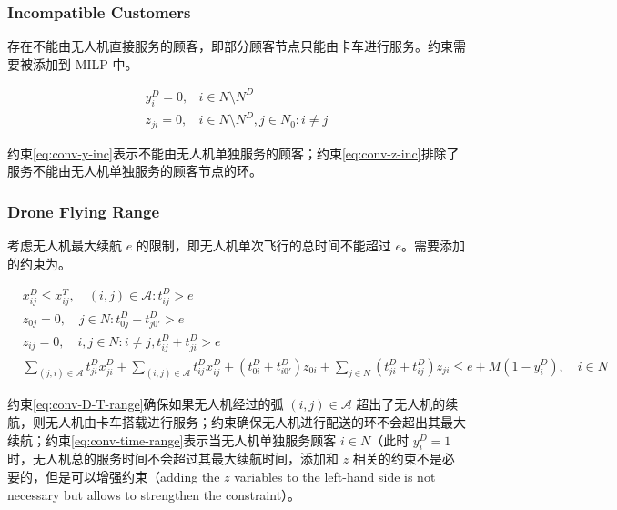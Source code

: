 \documentclass[fontset=none]{ctexart}
\begin{document}
\subsubsection{Incompatible Customers}
存在不能由无人机直接服务的顾客，即部分顾客节点只能由卡车进行服务。约束需要被添加到 MILP 中。

\begin{corollary}
    \begin{align}
        y_i^D = 0, & i \in N \setminus N^D \tag{4a} \label{eq:conv-y-inc} \\
        z_{ji} = 0, & i \in N \setminus N^D, j \in N_0: i \neq j \tag{4b} \label{eq:conv-z-inc}
    \end{align}
\end{corollary}

约束\cref{eq:conv-y-inc}表示不能由无人机单独服务的顾客；约束\cref{eq:conv-z-inc}排除了服务不能由无人机单独服务的顾客节点的环。

\subsubsection{Drone Flying Range}\label{sec:drone-flying-range}
考虑无人机最大续航 $e$ 的限制，即无人机单次飞行的总时间不能超过 $e$。需要添加的约束为。

\begin{corollary}
    \begin{align}
        & x_{ij}^D \leq x_{ij}^T, \quad (i, j) \in \mathcal{A}: t_{ij}^D > e \tag{5a}\label{eq:conv-D-T-range} \\
        & z_{0j} = 0, \quad j \in N: t_{0j}^D + t_{j0'}^D > e \tag{5b}\label{eq:conv-z-range} \\
        & z_{ij} = 0, \quad i,j \in N: i \neq j, t_{ij}^D + t_{ji}^D > e \tag{5c}\label{eq:conv-z-range-2} \\
        & \sum_{(j, i) \in \mathcal{A}}t_{ji}^Dx_{ji}^D + \sum_{(i,j) \in \mathcal{A}}t_{ij}^Dx_{ij}^D + \left(t_{0i}^D + t_{i0'}^D\right)z_{0i} + \sum_{j \in N}\left(t_{ji}^D + t_{ij}^D\right)z_{ji} \leq e + M\left(1 - y_i^D\right), \quad i \in N \tag{5d}\label{eq:conv-time-range}
    \end{align}
\end{corollary}

约束\cref{eq:conv-D-T-range}确保如果无人机经过的弧 $(i, j) \in \mathcal{A}$ 超出了无人机的续航，则无人机由卡车搭载进行服务；约束确保无人机进行配送的环不会超出其最大续航；约束\cref{eq:conv-time-range}表示当无人机单独服务顾客 $i \in N$（此时 $y_i^D = 1$ 时，无人机总的服务时间不会超过其最大续航时间，添加和 $z$ 相关的约束不是必要的，但是可以增强约束（adding the $z$ variables to the left-hand side is not necessary but allows to strengthen the constraint）。 
\end{document}
